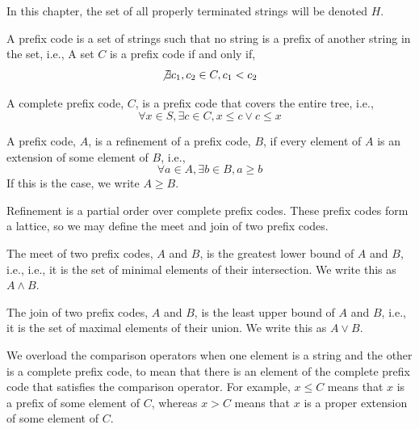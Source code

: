 In this chapter, the set of all properly terminated strings will be denoted $H$.

\begin{definition}
    A prefix code is a set of strings such that no string is a prefix of another string in the set, i.e.,
    A set $C$ is a prefix code if and only if,
    $$
    \not\exists c_1, c_2 \in C, c_1 < c_2
    $$
\end{definition}

\begin{definition}
    A complete prefix code, $C$, is a prefix code that covers the entire tree, i.e.,
    $$
    \forall x \in S, \exists c \in C, x \leq c \lor c \leq x
    $$
\end{definition}

\begin{definition}[Refinement]
    A prefix code, $A$, is a refinement of a prefix code, $B$,
    if every element of $A$ is an extension of some element of $B$, i.e.,
    $$
    \forall a \in A, \exists b \in B, a \geq b
    $$
    If this is the case, we write $A \geq B$.
\end{definition}

Refinement is a partial order over complete prefix codes.
These prefix codes form a lattice, so we may define the meet
and join of two prefix codes.

\begin{definition}[Meet]
    The meet of two prefix codes, $A$ and $B$, is the greatest lower bound of $A$ and $B$, i.e.,
    i.e.,
    it is the set of minimal elements of their intersection.
    We write this as $A \wedge B$.
\end{definition}

\begin{definition}[Join]
    The join of two prefix codes, $A$ and $B$, is the least upper bound of $A$ and $B$, i.e.,
    it is the set of maximal elements of their union.
    We write this as $A \vee B$.
\end{definition}

\begin{definition}
    We overload the comparison operators when one element is a string
    and the other is a complete prefix code,
    to mean that there is an element of the complete prefix code that satisfies the comparison operator.
    For example,
    $x \leq C$ means that $x$ is a prefix of some element of $C$,
    whereas $x > C$ means that $x$ is a proper extension of some element of $C$.
\end{definition}


